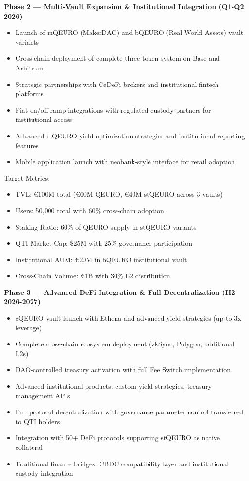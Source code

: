 \textbf{Phase 2 --- Multi-Vault Expansion \& Institutional Integration
(Q1-Q2 2026)}

\begin{itemize}
\item
  Launch of mQEURO (MakerDAO) and bQEURO (Real World Assets) vault
  variants
\item
  Cross-chain deployment of complete three-token system on Base and
  Arbitrum
\item
  Strategic partnerships with CeDeFi brokers and institutional fintech
  platforms
\item
  Fiat on/off-ramp integrations with regulated custody partners for
  institutional access
\item
  Advanced stQEURO yield optimization strategies and institutional
  reporting features
\item
  Mobile application launch with neobank-style interface for retail
  adoption
\end{itemize}

Target Metrics:

\begin{itemize}
\item
  TVL: €100M total (€60M QEURO, €40M stQEURO across 3 vaults)
\item
  Users: 50,000 total with 60\% cross-chain adoption
\item
  Staking Ratio: 60\% of QEURO supply in stQEURO variants
\item
  QTI Market Cap: \$25M with 25\% governance participation
\item
  Institutional AUM: €20M in bQEURO institutional vault
\item
  Cross-Chain Volume: €1B with 30\% L2 distribution
\end{itemize}

\textbf{Phase 3 --- Advanced DeFi Integration \& Full Decentralization
(H2 2026-2027)}

\begin{itemize}
\item
  eQEURO vault launch with Ethena and advanced yield strategies (up to
  3x leverage)
\item
  Complete cross-chain ecosystem deployment (zkSync, Polygon, additional
  L2s)
\item
  DAO-controlled treasury activation with full Fee Switch implementation
\item
  Advanced institutional products: custom yield strategies, treasury
  management APIs
\item
  Full protocol decentralization with governance parameter control
  transferred to QTI holders
\item
  Integration with 50+ DeFi protocols supporting stQEURO as native
  collateral
\item
  Traditional finance bridges: CBDC compatibility layer and
  institutional custody integration
\end{itemize}


